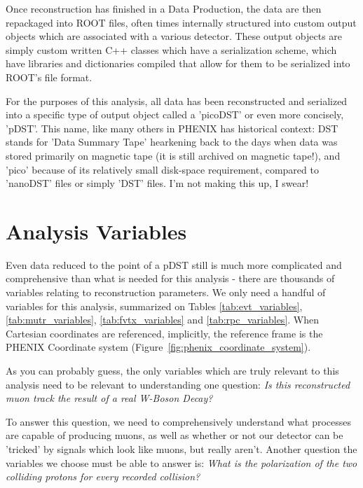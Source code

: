 Once reconstruction has finished in a Data Production, the data are then
repackaged into ROOT files, often times internally structured into custom output
objects which are associated with a various detector. These output objects are
simply custom written C++ classes which have a serialization scheme, which have
libraries and dictionaries compiled that allow for them to be serialized into
ROOT's file format.

For the purposes of this analysis, all data has been reconstructed and
serialized into a specific type of output object called a 'picoDST' or even more
concisely, 'pDST'. This name, like many others in PHENIX has historical context:
DST stands for 'Data Summary Tape' hearkening back to the days when data was
stored primarily on magnetic tape (it is still archived on magnetic tape!), and
'pico' because of its relatively small disk-space requirement, compared to
'nanoDST' files or simply 'DST' files. I'm not making this up, I swear!

\section{Analysis Variables}

Even data reduced to the point of a pDST still is much more complicated and
comprehensive than what is needed for this analysis - there are thousands of
variables relating to reconstruction parameters. We only need a handful of
variables for this analysis, summarized on Tables
\ref{tab:evt_variables},\ref{tab:mutr_variables}, \ref{tab:fvtx_variables} and
\ref{tab:rpc_variables}. When Cartesian coordinates are referenced, implicitly,
the reference frame is the PHENIX Coordinate system
(Figure~\ref{fig:phenix_coordinate_system}).

As you can probably guess, the only variables which are truly relevant to this
analysis need to be relevant to understanding one question: \textit{Is this
reconstructed muon track the result of a real W-Boson Decay?}

To answer this question, we need to comprehensively understand what processes
are capable of producing muons, as well as whether or not our detector can be
'tricked' by signals which look like muons, but really aren't. Another question
the variables we choose must be able to answer is: \textit{What is the
polarization of the two colliding protons for every recorded collision?}



